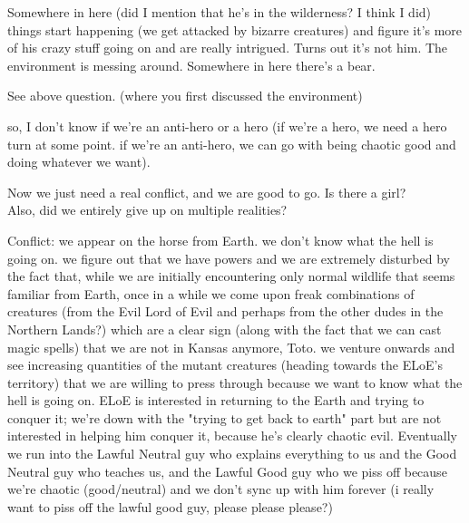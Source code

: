 Somewhere in here (did I mention that he's in the wilderness? I think I did)
things start happening (we get attacked by bizarre creatures) and figure it's
more of his crazy stuff going on and are really intrigued. Turns out it's not
him. The environment is messing around. Somewhere in here there's a bear.

\A See above question. (where you first discussed the environment)

\R so, I don't know if we're an anti-hero or a hero (if we're a hero, we need a
hero turn at some point. if we're an anti-hero, we can go with being chaotic
good and doing whatever we want).  

\A Now we just need a real conflict, and we are good to go. Is there a girl? \\
Also, did we entirely give up on multiple realities?

\R Conflict: we appear on the horse from Earth. we don't know what the hell is
going on. we figure out that we have powers and we are extremely disturbed by
the fact that, while we are initially encountering only normal wildlife that
seems familiar from Earth, once in a while we come upon freak combinations of
creatures (from the Evil Lord of Evil and perhaps from the other dudes in the
Northern Lands?) which are a clear sign (along with the fact that we can cast
magic spells) that we are not in Kansas anymore, Toto.  we venture onwards and
see increasing quantities of the mutant creatures (heading towards the ELoE's
territory) that we are willing to press through because we want to know what the
hell is going on. ELoE is interested in returning to the Earth and trying to
conquer it; we're down with the "trying to get back to earth" part but are not
interested in helping him conquer it, because he's clearly chaotic evil.
Eventually we run into the Lawful Neutral guy who explains everything to us and
the Good Neutral guy who teaches us, and the Lawful Good guy who we piss off
because we're chaotic (good/neutral) and we don't sync up with him forever (i
really want to piss off the lawful good guy, please please please?)
\E
